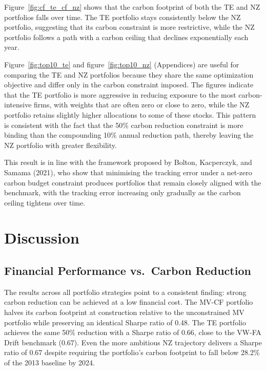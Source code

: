 \documentclass[11pt,a4paper]{article}
\begin{document}
Figure~\ref{fig:cf_te_cf_nz} shows that the carbon footprint of both the TE and NZ portfolios falls over time. The TE portfolio stays consistently below the NZ portfolio, suggesting that its carbon constraint is more restrictive, while the NZ portfolio follows a path with a carbon ceiling that declines exponentially each year.

Figure~\ref{fig:top10_te} and figure~\ref{fig:top10_nz} (Appendices) are useful for comparing the TE and NZ portfolios because they share the same optimization objective and differ only in the carbon constraint imposed. The figures indicate that the TE portfolio is more aggressive in reducing exposure to the most carbon-intensive firms, with weights that are often zero or close to zero, while the NZ portfolio retains slightly higher allocations to some of these stocks. This pattern is consistent with the fact that the 50\% carbon reduction constraint is more binding than the compounding 10\% annual reduction path, thereby leaving the NZ portfolio with greater flexibility.

This result is in line with the framework proposed by Bolton, Kacperczyk, and Samama (2021), who show that minimising the tracking error under a net-zero carbon budget constraint produces portfolios that remain closely aligned with the benchmark, with the tracking error increasing only gradually as the carbon ceiling tightens over time.

\section{Discussion}
\label{sec:discussion}

\subsection{Financial Performance vs.\ Carbon Reduction}

The results across all portfolio strategies point to a consistent finding: strong carbon reduction can be achieved at a low financial cost. The MV-CF portfolio halves its carbon footprint at construction relative to the unconstrained MV portfolio while preserving an identical Sharpe ratio of 0.48. The TE portfolio achieves the same 50\% reduction with a Sharpe ratio of 0.66, close to the VW-FA Drift benchmark (0.67). Even the more ambitious NZ trajectory delivers a Sharpe ratio of 0.67 despite requiring the portfolio's carbon footprint to fall below 28.2\% of the 2013 baseline by 2024.
\end{document}
